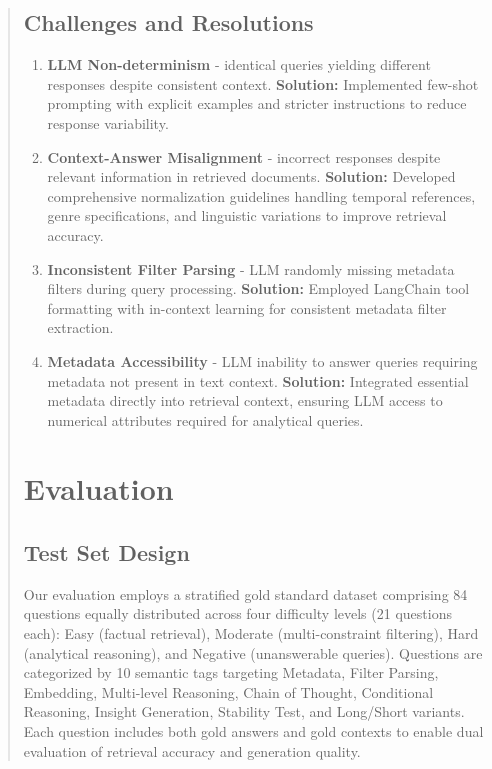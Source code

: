 \documentclass[11pt]{article}
\begin{document}
\begin{abstract}
\subsection{Challenges and Resolutions}

\begin{enumerate}[label=(\roman*)]
\item \textbf{LLM Non-determinism} - identical queries yielding different responses despite consistent context. \textbf{Solution:} Implemented few-shot prompting with explicit examples and stricter instructions to reduce response variability.
\item \textbf{Context-Answer Misalignment} - incorrect responses despite relevant information in retrieved documents. \textbf{Solution:} Developed comprehensive normalization guidelines handling temporal references, genre specifications, and linguistic variations to improve retrieval accuracy.
\item \textbf{Inconsistent Filter Parsing} - LLM randomly missing metadata filters during query processing. \textbf{Solution:} Employed LangChain tool formatting with in-context learning for consistent metadata filter extraction.
\item \textbf{Metadata Accessibility} - LLM inability to answer queries requiring metadata not present in text context. \textbf{Solution:} Integrated essential metadata directly into retrieval context, ensuring LLM access to numerical attributes required for analytical queries.
\end{enumerate}

\section{Evaluation}

\subsection{Test Set Design}

Our evaluation employs a stratified gold standard dataset comprising 84 questions equally distributed across four difficulty levels (21 questions each): Easy (factual retrieval), Moderate (multi-constraint filtering), Hard (analytical reasoning), and Negative (unanswerable queries). Questions are categorized by 10 semantic tags targeting Metadata, Filter Parsing, Embedding, Multi-level Reasoning, Chain of Thought, Conditional Reasoning, Insight Generation, Stability Test, and Long/Short variants. Each question includes both gold answers and gold contexts to enable dual evaluation of retrieval accuracy and generation quality.


\end{abstract}
\end{document}
